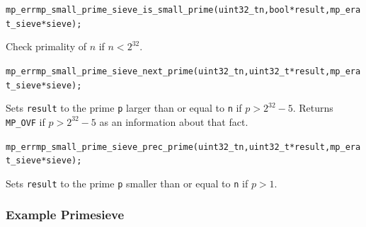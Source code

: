 \documentclass[synpaper]{book}
\begin{document}
\begin{alltt}
mp_err mp_small_prime_sieve_is_small_prime(uint32_t n, bool *result, mp_erat_sieve *sieve);
\end{alltt}
Check primality of $n$ if $n < 2^32$.


\begin{alltt}
mp_err mp_small_prime_sieve_next_prime(uint32_t n, uint32_t *result, mp_erat_sieve *sieve);
\end{alltt}
Sets {\texttt{result}} to the prime {\texttt{p}} larger than or equal to {\texttt{n}} if $p > 2^32 - 5$.
Returns {\texttt{MP\_OVF}} if $p > 2^32 - 5$ as an information about that fact.

\begin{alltt}
mp_err mp_small_prime_sieve_prec_prime(uint32_t n, uint32_t *result, mp_erat_sieve *sieve);
\end{alltt}
Sets {\texttt{result}} to the prime {\texttt{p}} smaller than or equal to {\texttt{n}} if $p > 1$.

\subsubsection{Example Primesieve}
\end{document}
